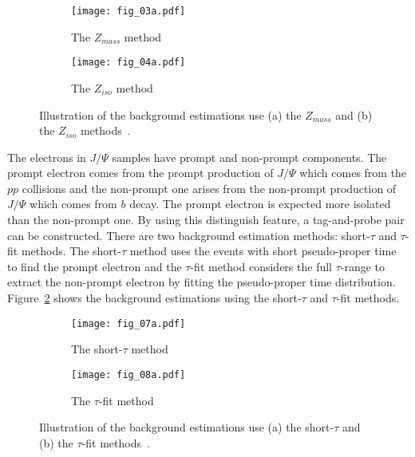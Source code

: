 \begin{figure}[htbp]
    \begin{subfigure}[b]{0.48\textwidth}
        \begin{center}
            \texttt{[image: fig\_03a.pdf]}
            \caption{The $Z_{mass}$ method}
        \end{center}
    \end{subfigure}
    \begin{subfigure}[b]{0.48\textwidth}
        \begin{center}
            \texttt{[image: fig\_04a.pdf]}
            \caption{The $Z_{iso}$ method}
        \end{center}
    \end{subfigure}
    \caption{Illustration of the background estimations use (a) the $Z_{mass}$ and (b) the $Z_{iso}$ methods~\cite{ATLAS:2016iqc}.}
    \label{fig:app_electron_isolation_Zee_background_subtraction_methods}
\end{figure}

The electrons in $J/\Psi$ samples have prompt and non-prompt components.
The prompt electron comes from the prompt production of $J/\Psi$ which comes from the $pp$ collisions and the non-prompt one arises from the non-prompt production of $J/\Psi$ which comes from $b$ decay.
The prompt electron is expected more isolated than the non-prompt one.
By using this distinguish feature, a tag-and-probe pair can be constructed.
There are two background estimation methods: short-$\tau$ and $\tau$-fit methods.
The short-$\tau$ method uses the events with short pseudo-proper time to find the prompt electron and the $\tau$-fit method considers the full $\tau$-range to extract the non-prompt electron by fitting the pseudo-proper time distribution.
Figure~\ref{fig:app_electron_isolation_JPsi_background_subtraction_methods} shows the background estimations using the short-$\tau$ and $\tau$-fit methods.

\begin{figure}[htbp]
    \begin{subfigure}[b]{0.48\textwidth}
        \begin{center}
            \texttt{[image: fig\_07a.pdf]}
            \caption{The short-$\tau$ method}
        \end{center}
    \end{subfigure}
    \begin{subfigure}[b]{0.48\textwidth}
        \begin{center}
            \texttt{[image: fig\_08a.pdf]}
            \caption{The $\tau$-fit method}
        \end{center}
    \end{subfigure}
    \caption{Illustration of the background estimations use (a) the short-$\tau$ and (b) the $\tau$-fit methods~\cite{Aaboud:2016vfy}.}
    \label{fig:app_electron_isolation_JPsi_background_subtraction_methods}
\end{figure}


